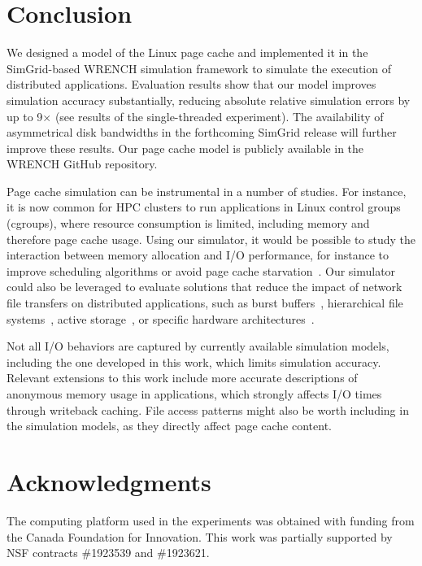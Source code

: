 \documentclass[conference]{IEEEtran}
\newcommand{\simgrid}{SimGrid\xspace}
\newcommand{\wrench}{WRENCH\xspace}
\begin{document}
    \section{Conclusion}
    \label{discussion}
    We designed a model of the Linux page cache and implemented it in the
    \simgrid-based \wrench simulation framework to simulate the execution
    of distributed applications.
    Evaluation results show that our model improves simulation accuracy
    substantially, reducing absolute relative simulation errors by up to
    9$\times$ (see results of the single-threaded experiment). The
    availability of asymmetrical disk bandwidths in the forthcoming
    \simgrid release will further improve these results.
    Our page cache model is publicly available in the \wrench GitHub
    repository.

    Page cache simulation can be instrumental in a number of studies. For
    instance, it is now common for HPC clusters to run applications in
    Linux control groups (cgroups), where resource consumption is limited,
    including memory and therefore page cache usage. Using our simulator,
    it would be possible to study the interaction between memory allocation
    and I/O performance, for instance to improve scheduling algorithms or
    avoid page cache starvation~\cite{zhuang2017}. Our simulator could also
    be leveraged to evaluate solutions that reduce the impact of network
    file transfers on distributed applications, such as burst
    buffers~\cite{ferreiradasilva-fgcs-bb-2019}, hierarchical file
    systems~\cite{islam2015triple}, active storage~\cite{5496981}, or
    specific hardware architectures~\cite{hayot2020performance}. 

    Not all I/O behaviors are captured by currently available simulation models,
    including the one developed in this work, 
    which limits simulation accuracy.
    Relevant extensions to this work include more
    accurate descriptions of anonymous memory usage in applications, 
    which strongly affects I/O times through writeback caching. File access patterns
    might also be worth including in the simulation models,
    as they directly affect page cache content.


        \section{Acknowledgments}
The computing platform used in the experiments was obtained with funding
from the Canada Foundation for Innovation. This work was partially supported
by NSF contracts \#1923539 and \#1923621.



\end{document}
